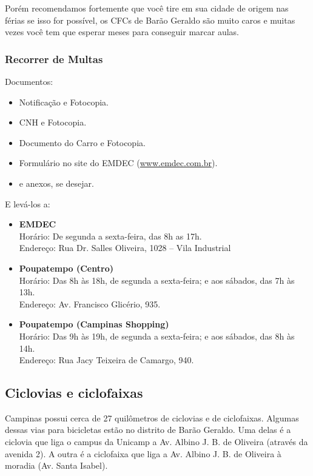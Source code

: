 Porém recomendamos fortemente que você tire em sua cidade de origem nas férias
se isso for possível, os CFCs de Barão Geraldo são muito caros e muitas vezes
você tem que esperar meses para conseguir marcar aulas.

\subsubsection{Recorrer de Multas}

Documentos:
\begin{itemize}
\item Notificação e Fotocopia.
\item CNH e Fotocopia.
\item Documento do Carro e Fotocopia.
\item Formulário no site do EMDEC (\url{www.emdec.com.br}).
\item e anexos, se desejar.
\end{itemize}

E levá-los a:
\begin{itemize}
\item \textbf{EMDEC}
  \\Horário: De segunda a sexta-feira, das 8h as 17h.
  \\Endereço: Rua Dr. Salles Oliveira, 1028 -- Vila Industrial

\item \textbf{Poupatempo (Centro)}
  \\Horário: Das 8h às 18h, de segunda a sexta-feira; e aos sábados, das 7h às
  13h.
  \\Endereço: Av. Francisco Glicério, 935.

\item \textbf{Poupatempo (Campinas Shopping)}
  \\Horário: Das 9h às 19h, de segunda a sexta-feira; e aos sábados, das 8h às
  14h.
  \\Endereço: Rua Jacy Teixeira de Camargo, 940.
\end{itemize}

\subsection{Ciclovias e ciclofaixas}

Campinas possui cerca de 27 quilômetros de ciclovias e de ciclofaixas. Algumas
dessas vias para bicicletas estão no distrito de Barão Geraldo. Uma delas é a
ciclovia que liga o campus da Unicamp a Av. Albino J. B. de Oliveira (através
da avenida 2). A outra é a ciclofaixa que liga a Av. Albino J. B. de Oliveira
à moradia (Av. Santa Isabel).

